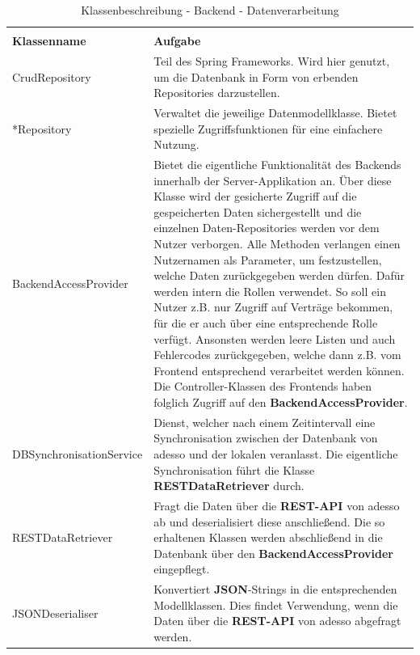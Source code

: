 \clearpage

\begin{center}
\begin{longtable}[h]{p{5cm} p{9cm}}
	\caption{Klassenbeschreibung - Backend - Datenverarbeitung}
	\label{table:klassenbeschreibung-backend-data}
	\endlastfoot
	\multicolumn{2}{r}{{Weitergeführt auf der folgenden Seite}} \\
	\endfoot
	\endhead
	\rowcolor[HTML]{C0C0C0} 
	\textbf{Klassenname} & \textbf{Aufgabe} \\
    CrudRepository & Teil des Spring Frameworks. Wird hier genutzt, um die Datenbank in Form von erbenden Repositories darzustellen. \\
	\rowcolor[HTML]{E7E7E7} 
	*Repository & Verwaltet die jeweilige Datenmodellklasse. Bietet spezielle Zugriffsfunktionen für eine einfachere Nutzung. \\
	BackendAccessProvider & Bietet die eigentliche Funktionalität des Backends innerhalb der Server-Applikation an. Über diese Klasse wird der gesicherte Zugriff auf die gespeicherten Daten sichergestellt und die 
    einzelnen Daten-Repositories werden vor dem Nutzer verborgen. Alle Methoden verlangen einen Nutzernamen als Parameter, um festzustellen, welche Daten zurückgegeben werden dürfen. Dafür werden intern die Rollen verwendet.
    So soll ein Nutzer z.B. nur Zugriff auf Verträge bekommen, für die er auch über eine entsprechende Rolle verfügt. Ansonsten werden leere Listen und auch Fehlercodes zurückgegeben, welche dann z.B. vom Frontend
    entsprechend verarbeitet werden können. Die Controller-Klassen des Frontends haben folglich Zugriff auf den \textbf{BackendAccessProvider}. \\
	\rowcolor[HTML]{E7E7E7} 
	DBSynchronisationService & Dienst, welcher nach einem Zeitintervall eine Synchronisation zwischen der Datenbank von adesso und der lokalen veranlasst. 
	Die eigentliche Synchronisation führt die Klasse \textbf{RESTDataRetriever} durch. \\
    RESTDataRetriever & Fragt die Daten über die \textbf{REST-API} von adesso ab und deserialisiert diese anschlie{\ss}end. Die so erhaltenen Klassen werden abschließend in die Datenbank über den \textbf{BackendAccessProvider} eingepflegt. \\
	\rowcolor[HTML]{E7E7E7} 
    JSONDeserialiser & Konvertiert \textbf{JSON}-Strings in die entsprechenden Modellklassen. Dies findet Verwendung, wenn die Daten über die \textbf{REST-API} von adesso abgefragt werden. \\
\end{longtable}
\end{center}

